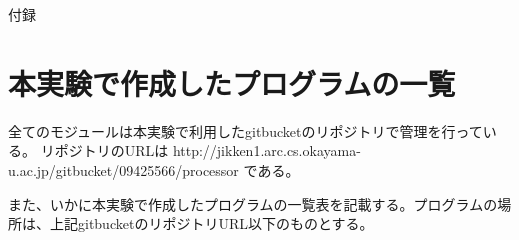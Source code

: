 \documentclass{jarticle}[11pt]
\begin{document}
\newpage
\appendix

\noindent
{\Large \gt 付録}


\section{本実験で作成したプログラムの一覧}

全てのモジュールは本実験で利用したgitbucketのリポジトリで管理を行っている。
リポジトリのURLは
http://jikken1.arc.cs.okayama-u.ac.jp/gitbucket/09425566/processor
である。

また、いかに本実験で作成したプログラムの一覧表を記載する。プログラムの場所は、上記gitbucketのリポジトリURL以下のものとする。
\end{document}
